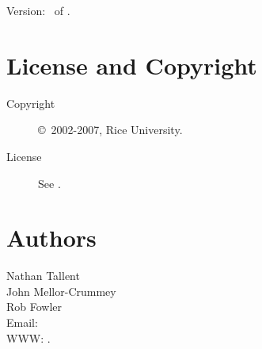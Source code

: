 \documentclass[english]{article}
\begin{document}
Version: \Version\ of \Date.

\section{License and Copyright}

\begin{description}
\item[Copyright] \copyright\ 2002-2007, Rice University.
\item[License] See .
\end{description}

\section{Authors}

\noindent
Nathan Tallent \\
John Mellor-Crummey \\
Rob Fowler \\
Email:  \\
WWW: .

\LatexManEnd
\end{document}
